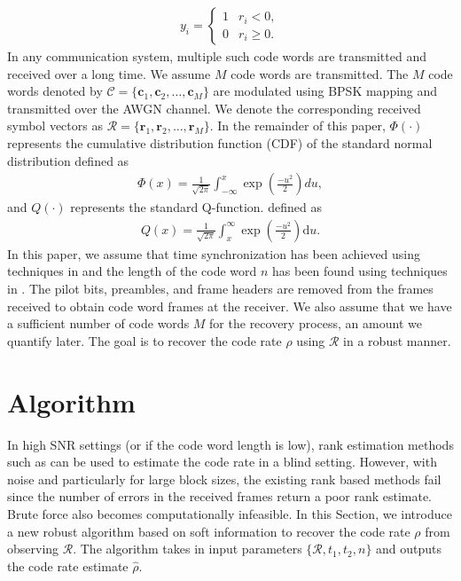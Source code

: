\documentclass[conference]{IEEEtran}
\def\c{\mathbf{c}}
\def\r{\mathbf{r}}
\begin{document}
\begin{align*}
    y_i = \begin{cases}
        1 & r_i < 0,\\
        0 & r_i \geq 0.
    \end{cases}
\end{align*}
In any communication system, multiple such code words are transmitted and received over a long time. We assume $M$ code words are transmitted. The $M$ code words denoted  by $\mathcal{C}=\{\c_1, \c_2, \ldots, \c_M\}$ are modulated using BPSK mapping and transmitted over the AWGN channel.   We denote the corresponding received symbol vectors as $\mathcal{R}=\{\r_1, \r_2, \ldots, \r_M\}$. In the remainder of this paper, $\Phi(\cdot)$ represents the cumulative distribution function (CDF) of the standard normal distribution 
defined as
\begin{align*}
    \Phi(x) = \frac{1}{\sqrt{2\pi}} \int_{-\infty}^x \exp \left( \frac{-u^2}{2} \right) du,
\end{align*}
 and $Q(\cdot)$ represents the standard Q-function.
 defined as
\begin{align*}
    Q(x) = \frac{1}{\sqrt{2\pi}} \int_x^\infty \exp\left(\frac{-u^2}{2}\right) \text{d}u.
\end{align*}
In this paper, we  assume that time synchronization has been achieved using techniques in \cite{cluzeau} and the length of the code word $n$ has been found using techniques in \cite{ramabadran}. The pilot bits, preambles, and frame headers are removed from the frames received to obtain code word frames at the receiver. We also assume that we have a sufficient number of code words $M$ for the recovery process, an amount we quantify later. The goal is to recover the code rate $\rho$ using $\mathcal{R}$ in a  robust manner. 

\section{Algorithm}
In high SNR settings (or if the code word length is low), rank estimation methods such as \cite{kuvaja} can be used to estimate the code rate in a blind setting. However, with noise and particularly for large block sizes, the existing  rank based methods fail since the number of errors in the received frames return a poor rank estimate. Brute force also becomes computationally infeasible. In this Section, we introduce a new robust algorithm  based on soft information to recover the code rate $\rho$ from observing $\mathcal{R}$.
The algorithm takes in input parameters $\{\mathcal{R}, t_1,t_2,n\}$ and outputs the code rate estimate $\hat{\rho}$.
\end{document}
